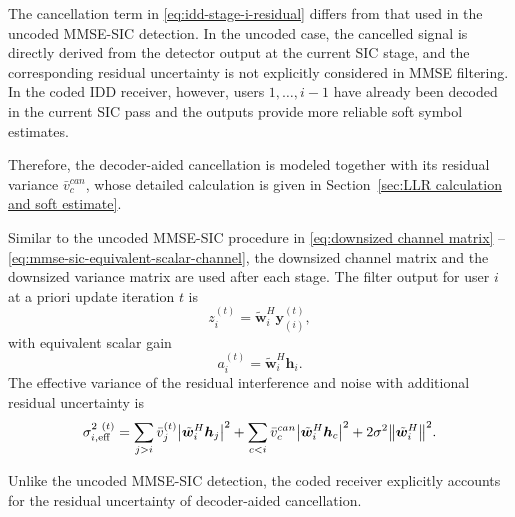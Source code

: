 The cancellation term in \eqref{eq:idd-stage-i-residual} differs from that used in the uncoded MMSE-SIC detection. 
In the uncoded case, the cancelled signal is directly derived from the detector output at the current SIC stage, and the corresponding residual uncertainty is not explicitly considered in MMSE filtering. 
In the coded IDD receiver, however, users $1,\ldots,i-1$ have already been decoded in the current SIC pass and the outputs provide more reliable soft symbol estimates. 

Therefore, the decoder-aided cancellation is modeled together with its residual variance $\bar{v}_c^{can}$, whose detailed calculation is given in Section~\ref{sec:LLR calculation and soft estimate}.

Similar to the uncoded MMSE-SIC procedure in \eqref{eq:downsized channel matrix} -- \eqref{eq:mmse-sic-equivalent-scalar-channel}, the downsized channel matrix and the downsized variance matrix are used after each stage. The filter output for user $i$ at a priori update iteration $t$ is
\begin{equation}
    z^{(t)}_{i}
    =
    \tilde{\bm{w}}^H_i
    \bm{y}_{(i)}^{(t)},
\end{equation}
with equivalent scalar gain
\begin{equation}
    a^{(t)}_{i}
    =
    \tilde{\bm{w}}^H_i\bm{h}_i .
\end{equation}
The effective variance of the residual interference and noise with additional residual uncertainty is
\begin{equation}
    \sigma_{i,\mathrm{eff}}^{2~(t)}
    =
    \sum_{j>i}
    \bar{v}_j^{(t)}
    \abs{\tilde{\bm{w}}^H_i\bm{h}_j}^2
    +
    \sum_{c<i}
    \bar{v}_c^{can}
    \abs{\tilde{\bm{w}}^H_i\bm{h}_c}^2
    +
    2\sigma^2\norm{\tilde{\bm{w}}^H_i}^2 .
    \label{eq:idd-eff-var}
\end{equation}

Unlike the uncoded MMSE-SIC detection, the coded receiver explicitly accounts for the residual uncertainty of decoder-aided cancellation.


